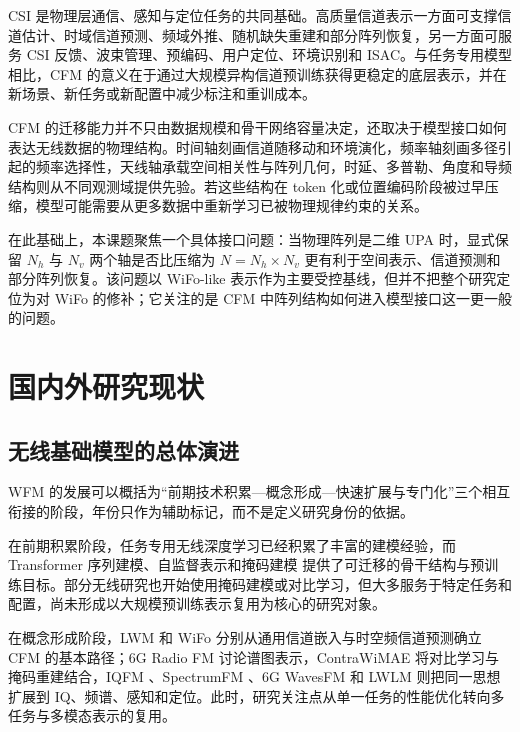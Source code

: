 \documentclass[journal]{IEEEtran}
\begin{document}
CSI 是物理层通信、感知与定位任务的共同基础。高质量信道表示一方面可支撑信道估计、时域信道预测、频域外推、随机缺失重建和部分阵列恢复，另一方面可服务 CSI 反馈、波束管理、预编码、用户定位、环境识别和 ISAC。与任务专用模型相比，CFM 的意义在于通过大规模异构信道预训练获得更稳定的底层表示，并在新场景、新任务或新配置中减少标注和重训成本。

CFM 的迁移能力并不只由数据规模和骨干网络容量决定，还取决于模型接口如何表达无线数据的物理结构。时间轴刻画信道随移动和环境演化，频率轴刻画多径引起的频率选择性，天线轴承载空间相关性与阵列几何，时延、多普勒、角度和导频结构则从不同观测域提供先验。若这些结构在 token 化或位置编码阶段被过早压缩，模型可能需要从更多数据中重新学习已被物理规律约束的关系。

在此基础上，本课题聚焦一个具体接口问题：当物理阵列是二维 UPA 时，显式保留 \(N_h\) 与 \(N_v\) 两个轴是否比压缩为 \(N=N_h\times N_v\) 更有利于空间表示、信道预测和部分阵列恢复。该问题以 WiFo-like 表示作为主要受控基线，但并不把整个研究定位为对 WiFo 的修补；它关注的是 CFM 中阵列结构如何进入模型接口这一更一般的问题。

\section{国内外研究现状}

\subsection{无线基础模型的总体演进}

WFM 的发展可以概括为“前期技术积累—概念形成—快速扩展与专门化”三个相互衔接的阶段，年份只作为辅助标记，而不是定义研究身份的依据。

在前期积累阶段，任务专用无线深度学习已经积累了丰富的建模经验，而 Transformer 序列建模、自监督表示和掩码建模 \cite{vaswani2017attention,devlin2019bert,he2022mae,tong2022videomae} 提供了可迁移的骨干结构与预训练目标。部分无线研究也开始使用掩码建模或对比学习，但大多服务于特定任务和配置，尚未形成以大规模预训练表示复用为核心的研究对象。

在概念形成阶段，LWM \cite{alikhani2024lwm} 和 WiFo \cite{liu2025wifo} 分别从通用信道嵌入与时空频信道预测确立 CFM 的基本路径；6G Radio FM \cite{aboulfotouh2025radiofm} 讨论谱图表示，ContraWiMAE \cite{guler2026contrawimae} 将对比学习与掩码重建结合，IQFM \cite{zhou2026iqfm}、SpectrumFM \cite{zhou2025spectrumfm,liu2025spectrumfm}、6G WavesFM \cite{aboulfotouh2025wavesfm} 和 LWLM \cite{pan2026lwlm} 则把同一思想扩展到 IQ、频谱、感知和定位。此时，研究关注点从单一任务的性能优化转向多任务与多模态表示的复用。
\end{document}
